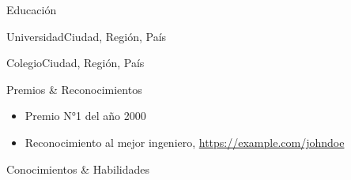 \documentclass[
	spanish, %
	letterpaper
]{article}
\def\name {John Doe}
\begin{document}
\begin{cvblock}{Educación}
	\begin{institution}[]{Universidad}{Ciudad, Región, País}
	\end{institution}

	\begin{institution}{Colegio}{Ciudad, Región, País}
	\end{institution}
\end{cvblock}

\begin{cvblock}{Premios \& Reconocimientos}
	\begin{itemize}
		\item Premio N°1 del año 2000
		\item Reconocimiento al mejor ingeniero, \url{https://example.com/johndoe}
	\end{itemize}
\end{cvblock}

\begin{cvblock}{Conocimientos \& Habilidades}
\end{cvblock}

\begin{signature}
	\signatureentry{\name}
\end{signature}

\end{document}
